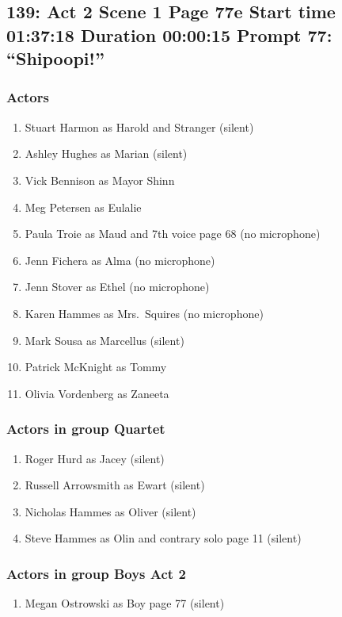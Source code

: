 \subsection{139: Act 2 Scene 1 Page 77e Start time 01:37:18 Duration 00:00:15 Prompt 77: ``Shipoopi!''}

\subsubsection{Actors}
\begin{enumerate}
\item Stuart Harmon as Harold and Stranger (silent)
\item Ashley Hughes as Marian (silent)
\item Vick Bennison as Mayor Shinn
\item Meg Petersen as Eulalie
\item Paula Troie as Maud and 7th voice page 68 (no microphone)
\item Jenn Fichera as Alma (no microphone)
\item Jenn Stover as Ethel (no microphone)
\item Karen Hammes as Mrs.~Squires (no microphone)
\item Mark Sousa as Marcellus (silent)
\item Patrick McKnight as Tommy
\item Olivia Vordenberg as Zaneeta
\end{enumerate}
\subsubsection{Actors in group Quartet}
\begin{enumerate}
\item Roger Hurd as Jacey (silent)
\item Russell Arrowsmith as Ewart (silent)
\item Nicholas Hammes as Oliver (silent)
\item Steve Hammes as Olin and contrary solo page 11 (silent)
\end{enumerate}
\subsubsection{Actors in group Boys Act 2}
\begin{enumerate}
\item Megan Ostrowski as Boy page 77 (silent)
\end{enumerate}

